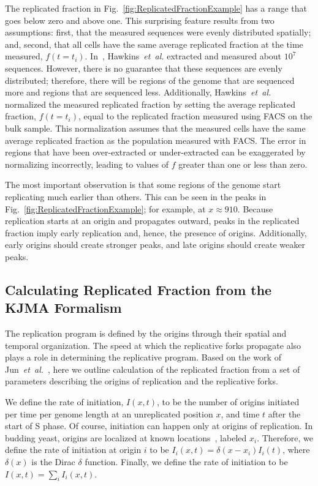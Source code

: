 		The replicated fraction in Fig.~\ref{fig:ReplicatedFractionExample} has a range that goes below zero and above one.
		This surprising feature results from two assumptions: first, that the measured sequences were evenly distributed spatially; and, second, that all cells have the same average replicated fraction at the time measured, $f(t=t_i)$.
		In~\cite{StochasticTermination}, Hawkins~\emph{et~al.} extracted and measured about $10^7$ sequences.
		However, there is no guarantee that these sequences are evenly distributed; therefore, there will be regions of the genome that are sequenced more and regions that are sequenced less.
		Additionally, Hawkins~\emph{et~al.} normalized the measured replicated fraction by setting the average replicated fraction, $f(t=t_i)$, equal to the replicated fraction measured using FACS on the bulk sample.
		This normalization assumes that the measured cells have the same average replicated fraction as the population measured with FACS.
		The error in regions that have been over-extracted or under-extracted can be exaggerated by normalizing incorrectly, leading to values of $f$ greater than one or less than zero.
		
		The most important observation is that some regions of the genome start replicating much earlier than others.
		This can be seen in the peaks in Fig.~\ref{fig:ReplicatedFractionExample}; for example, at $x \approx 910$.
		Because replication starts at an origin and propagates outward, peaks in the replicated fraction imply early replication and, hence, the presence of origins.
		Additionally, early origins should create stronger peaks, and late origins should create weaker peaks.
		
		
		\subsection{Calculating Replicated Fraction from the KJMA Formalism}
		\label{subsec:KJMA}
		
		The replication program is defined by the origins through their spatial and temporal organization.
		The speed at which the replicative forks propagate also plays a role in determining the replicative program.
		Based on the work of Jun~\emph{et~al.}~\cite{KJMA1}, here we outline calculation of the replicated fraction from a set of parameters describing the origins of replication and the replicative forks.
		
		We define the rate of initiation, $I(x,t)$, to be the number of origins initiated per time per genome length at an unreplicated position $x$, and time $t$ after the start of S phase.
		Of course, initiation can happen only at origins of replication.
		In budding yeast, origins are localized at known locations~\cite{OriDB}, labeled $x_i$.
		Therefore, we define the rate of initiation at origin $i$ to be $I_i(x,t)=\delta(x-x_i)I_i(t)$, where $\delta(x)$ is the Dirac $\delta$ function.
		Finally, we define the rate of initiation to be $I(x,t) = \sum\limits_i I_i(x,t)$.
		
